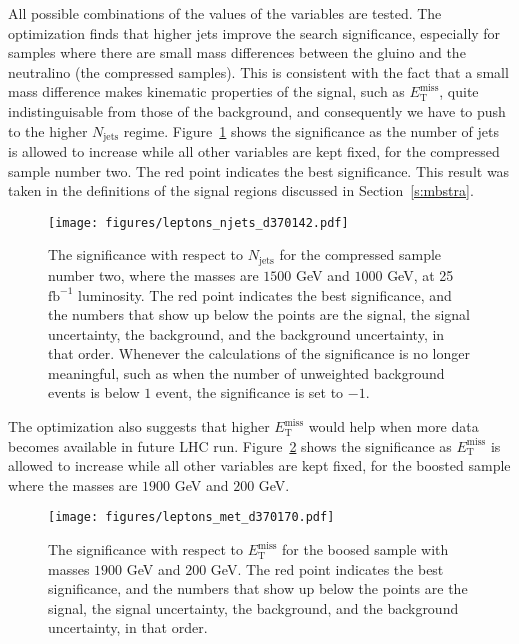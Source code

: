 All possible combinations of the values of the variables are tested. The
optimization finds that higher jets improve the search significance, especially
for samples where there are small mass differences between the gluino and the
neutralino (the compressed samples). This is consistent with the fact that a
small mass difference makes kinematic properties of the signal, such as
$E_{\text{T}}^{\text{miss}}$, quite indistinguisable from those of the
background, and consequently we have to push to the higher $N_{\text{jets}}$
regime. Figure~\ref{f:mbnjetsop} shows the significance as the number of jets
is allowed to increase while all other variables are kept fixed, for the
compressed sample number two. The red point indicates the best significance.
This result was taken in the definitions of the signal regions discussed in
Section~\ref{s:mbstra}.



\begin{figure}[H]
	\texttt{[image: figures/leptons\_njets\_d370142.pdf]}
	\centering

	\caption{The significance with respect to $N_{\text{jets}}$ for the compressed
		sample number two, where the masses are $1500$ GeV and $1000$ GeV, at 25
		$\text{fb}^{-1}$ luminosity. The red point indicates the best significance, and
		the numbers that show up below the points are the signal, the signal
		uncertainty, the background, and the background uncertainty, in that order.
		Whenever the calculations of the significance is no longer meaningful, such as
		when the number of unweighted background events is below $1$ event, the
		significance is set to $-1$.}

	\label{f:mbnjetsop}
\end{figure}

The optimization also suggests that higher $E_{\text{T}}^{\text{miss}}$ would
help when more data becomes available in future LHC run.
Figure~\ref{f:mbmetsop} shows the significance as $E_{\text{T}}^{\text{miss}}$
is allowed to increase while all other variables are kept fixed, for the
boosted sample where the masses are $1900$ GeV and $200$ GeV.

\begin{figure}[H]
	\texttt{[image: figures/leptons\_met\_d370170.pdf]}
	\centering

	\caption{The significance with respect to $E_{\text{T}}^{\text{miss}}$ for
		the boosed sample with masses $1900$ GeV and $200$ GeV. The red point
		indicates the best significance, and the numbers that show up below the
		points are the signal, the signal uncertainty, the background, and the
		background uncertainty, in that order.}

	\label{f:mbmetsop}
\end{figure}

